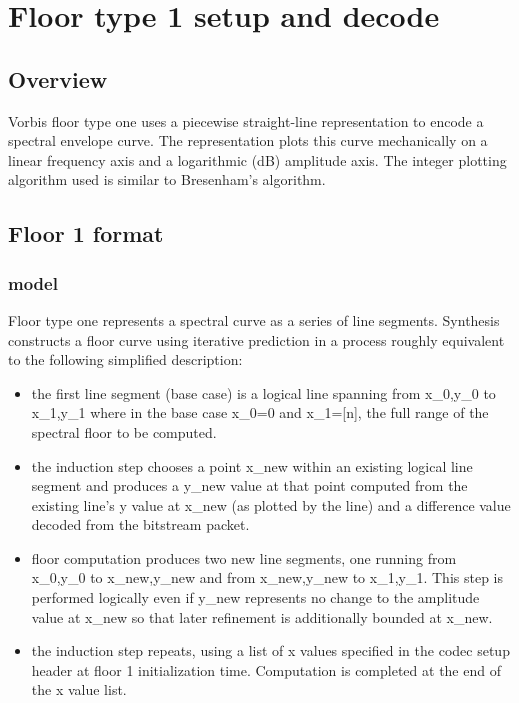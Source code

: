 \section{Floor type 1 setup and decode} \label{vorbis:spec:floor1}

\subsection{Overview}

Vorbis floor type one uses a piecewise straight-line representation to
encode a spectral envelope curve. The representation plots this curve
mechanically on a linear frequency axis and a logarithmic (dB)
amplitude axis. The integer plotting algorithm used is similar to
Bresenham's algorithm.



\subsection{Floor 1 format}

\subsubsection{model}

Floor type one represents a spectral curve as a series of
line segments.  Synthesis constructs a floor curve using iterative
prediction in a process roughly equivalent to the following simplified
description:

\begin{itemize}
 \item  the first line segment (base case) is a logical line spanning
from x_0,y_0 to x_1,y_1 where in the base case x_0=0 and x_1=[n], the
full range of the spectral floor to be computed.

\item the induction step chooses a point x_new within an existing
logical line segment and produces a y_new value at that point computed
from the existing line's y value at x_new (as plotted by the line) and
a difference value decoded from the bitstream packet.

\item floor computation produces two new line segments, one running from
x_0,y_0 to x_new,y_new and from x_new,y_new to x_1,y_1. This step is
performed logically even if y_new represents no change to the
amplitude value at x_new so that later refinement is additionally
bounded at x_new.

\item the induction step repeats, using a list of x values specified in
the codec setup header at floor 1 initialization time.  Computation
is completed at the end of the x value list.

\end{itemize}



